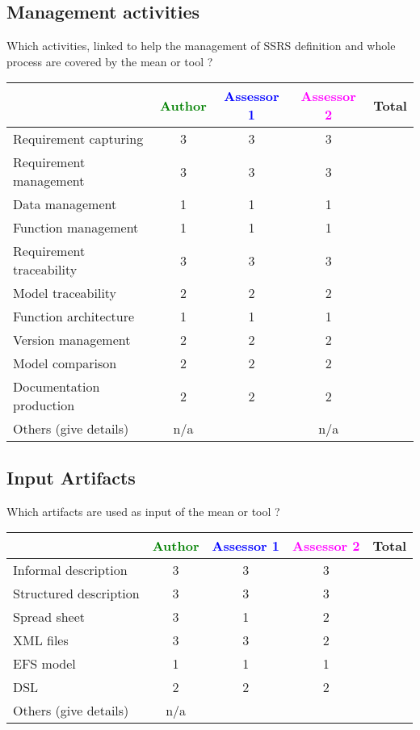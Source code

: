 \subsection{Management activities}

Which activities, linked to help the management of SSRS definition and whole process are covered by the mean or tool  ?

\begin{tabular}{|l | c | c | c | c|}
\hline
& \textcolor{green}{Author} & \textcolor{blue}{Assessor 1} & \textcolor{magenta}{Assessor 2} & Total \\
\hline
Requirement capturing & 3 & 3 & 3 &  \\
\hline
Requirement management  & 3 & 3 & 3 & \\
\hline
Data management & 1 & 1 & 1 & \\
\hline
Function management & 1 & 1 & 1 & \\
\hline
Requirement traceability  & 3 & 3 & 3 & \\
\hline
Model traceability & 2 & 2 & 2 & \\
\hline
Function architecture & 1 & 1 & 1 & \\
\hline
Version management & 2 & 2 & 2 & \\
\hline
Model comparison & 2 & 2 & 2 & \\
\hline
Documentation production & 2 & 2 & 2 & \\
\hline
Others (give details) & n/a & & n/a & \\
\hline
\end{tabular}

\subsection{Input Artifacts}

Which artifacts are used as input of the mean or tool  ?


\begin{tabular}{|l | c | c | c | c|}
\hline
& \textcolor{green}{Author} & \textcolor{blue}{Assessor 1} & \textcolor{magenta}{Assessor 2} & Total \\
\hline
Informal description & 3 & 3 & 3 &  \\
\hline
Structured description & 3 & 3 & 3 & \\
\hline
Spread sheet & 3 & 1 & 2 & \\
\hline
XML files & 3 & 3 & 2 & \\
\hline
EFS model & 1 & 1 & 1 & \\
\hline
DSL & 2 & 2 & 2 & \\
\hline
Others (give details) & n/a & & & \\
\hline
\end{tabular}

